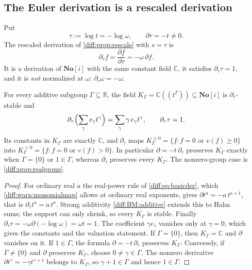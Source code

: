 \documentclass[11pt,letterpaper]{article}
\numberwithin{equation}{section}
\theoremstyle{definition}
\theoremstyle{remark}
\newcommand{\SC}{\mathbf{No}[i]}
\newcommand{\R}{\mathbb R}
\newcommand{\C}{\mathbb C}
\newcommand{\der}{\partial}
\newcommand{\derT}{\der_{\tau}}
\begin{document}
\subsection{The Euler derivation is a rescaled derivation}
\label{diff:rs:sub:euler}

Put
\begin{equation}\label{diff:rs:eq:tau}
 \tau:=\log t=-\log\omega,
 \qquad
 \der\tau=-t\neq0 .
\end{equation}
The rescaled derivation of \cref{diff:prop:rescale} with $s=\tau$ is
\begin{equation}\label{diff:rs:eq:euler}
 \derT f=\frac{\der f}{\der\tau}=-\omega\,\der f .
\end{equation}
It is a derivation of $\SC$ with the same constant field $\C$, it satisfies
$\derT\tau=1$, and it is \emph{not} normalized at $\omega$: $\derT\omega=-\omega$.

\begin{lemma}
\label{diff:rs:lem:euler}
For every additive subgroup $\Gamma\subseteq\R$, the field
$K_{\Gamma}=\C((t^{\Gamma}))\subseteq\SC$ is $\derT$-stable and
\begin{equation}\label{diff:rs:eq:eulerhahn}
 \derT\Bigl(\sum_{\gamma}c_{\gamma}t^{\gamma}\Bigr)
 =\sum_{\gamma}\gamma\,c_{\gamma}t^{\gamma},
 \qquad
 \derT\tau=1 .
\end{equation}
Its constants in $K_{\Gamma}$ are exactly $\C$, and $\derT$ maps
$K_{\Gamma}^{\geq0}=\{f:f=0\text{ or }v(f)\geq0\}$ into
$K_{\Gamma}^{>0}=\{f:f=0\text{ or }v(f)>0\}$. In particular
$\der=-t\,\derT$ preserves $K_{\Gamma}$ exactly when
$\Gamma=\{0\}$ or $1\in\Gamma$, whereas $\derT$ preserves every
$K_{\Gamma}$. The nonzero-group case is \cref{diff:prop:realgroup}.
\end{lemma}
\begin{proof}
For ordinary real $a$ the real-power rule of \cref{diff:eq:basicder}, which
\cref{diff:warn:monomialmap} allows at ordinary real exponents, gives
$\der t^{a}=-a\,t^{a+1}$, that is $\derT t^{a}=a\,t^{a}$. Strong additivity
\ref{diff:BM:additive} extends this to Hahn sums; the support can only shrink,
so every $K_{\Gamma}$ is stable. Finally $\derT\tau=-\omega\der(-\log\omega)
=\omega t=1$. The coefficient $\gamma c_{\gamma}$ vanishes only at $\gamma=0$,
which gives the constants and the valuation statement.
If $\Gamma=\{0\}$, then $K_\Gamma=\C$ and $\der$ vanishes on it.
If $1\in\Gamma$, the formula $\der=-t\,\derT$ preserves $K_\Gamma$.
Conversely, if $\Gamma\ne\{0\}$ and $\der$ preserves $K_\Gamma$, choose
$0\ne\gamma\in\Gamma$. The nonzero derivative
$\der t^\gamma=-\gamma t^{\gamma+1}$ belongs to $K_\Gamma$, so
$\gamma+1\in\Gamma$ and hence $1\in\Gamma$.
\end{proof}
\end{document}
